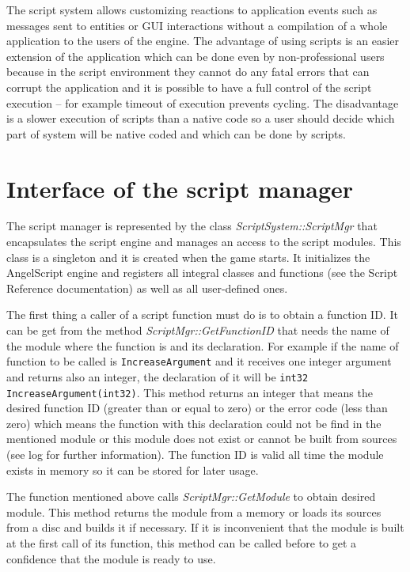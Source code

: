 \documentclass[a4paper, 12pt]{report}
\begin{document}
The script system allows customizing reactions to application events such as messages sent to entities or GUI interactions without a compilation of a whole application to the users of the engine. The advantage of using scripts is an easier extension of the application which can be done even by non-professional users because in the script environment they cannot do any fatal errors that can corrupt the application and it is possible to have a full control of the script execution -- for example timeout of execution prevents cycling. The disadvantage is a slower execution of scripts than a native code so a user should decide which part of system will be native coded and which can be done by scripts.

\section{Interface of the script manager}

The script manager is represented by the class \emph{ScriptSystem::ScriptMgr} that encapsulates the script engine and manages an access to the script modules. This class is a singleton and it is created when the game starts. It initializes the AngelScript engine and registers all integral classes and functions (see the Script Reference documentation) as well as all user-defined ones.

The first thing a caller of a script function must do is to obtain a function ID. It can be get from the method \emph{ScriptMgr::GetFunctionID} that needs the name of the module where the function is and its declaration. For example if the name of function to be called is \verb/IncreaseArgument/ and it receives one integer argument and returns also an integer, the declaration of it will be \verb/int32 IncreaseArgument(int32)/. This method returns an integer that means the desired function ID (greater than or equal to zero) or the error code (less than zero) which means the function with this declaration could not be find in the mentioned module or this module does not exist or cannot be built from sources (see log for further information). The function ID is valid all time the module exists in memory so it can be stored for later usage.

The function mentioned above calls \emph{ScriptMgr::GetModule} to obtain desired module. This method returns the module from a memory or loads its sources from a disc and builds it if necessary. If it is inconvenient that the module is built at the first call of its function, this method can be called before to get a confidence that the module is ready to use.
\end{document}
